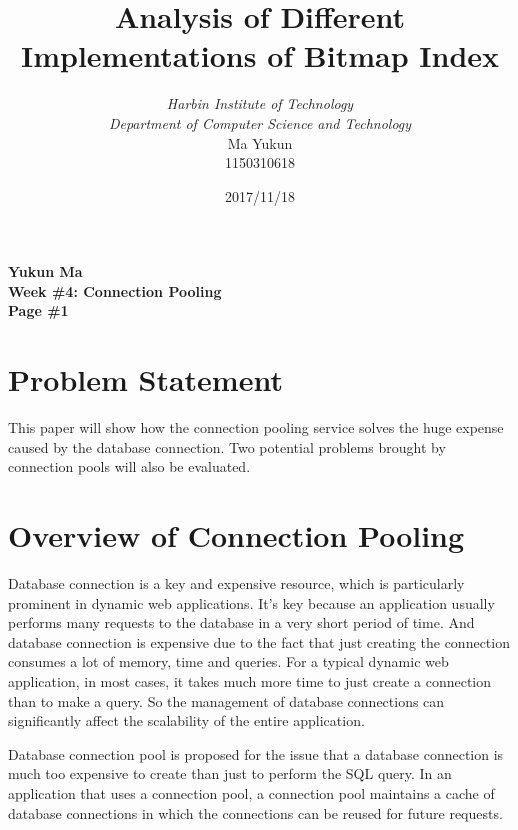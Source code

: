 \documentclass[12pt, a4paper]{article}
\begin{document}
\title{{\bf\Huge Analysis of Different Implementations of Bitmap Index}}
\author{\emph{Harbin Institute of Technology}\\\emph{Department of Computer Science and Technology}\\Ma Yukun\\1150310618}

\date{2017/11/18}

\nocite{*}


\begin{center}
{\textbf{
Yukun Ma\\
Week \#4: Connection Pooling\\
Page \#1}}
\end{center}

\section{Problem Statement}

This paper will show how the connection pooling service solves the huge expense caused by the database connection. Two potential problems brought by connection pools will also be evaluated.




\section{Overview of Connection Pooling}

Database connection is a key and expensive resource, which is particularly prominent in dynamic web applications. It's key because an application usually performs many requests to the database in a very short period of time. And database connection is expensive due to the fact that just creating the connection consumes a lot of memory, time and queries. For a typical dynamic web application, in most cases, it takes much more time to just create a connection than to make a query. So the management of database connections can significantly affect the scalability of the entire application.

Database connection pool is proposed for the issue that a database connection is much too expensive to create than just to perform the SQL query. In an application that uses a connection pool, a connection pool maintains a cache of database connections in which the connections can be reused for future requests.\cite{cp_wiki}
\end{document}
